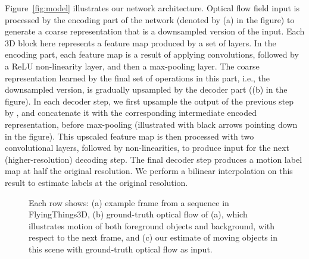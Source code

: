 \documentclass[10pt,twocolumn,letterpaper]{article}
\begin{document}
Figure~\ref{fig:model} illustrates our network architecture. Optical flow
field input is processed by the encoding part of the network (denoted by (a) in
the figure) to generate a coarse representation that is a 
downsampled version of the input. Each 3D block here represents a feature map
produced by a set of layers. In the encoding part, each feature map is a result
of applying convolutions, followed by a ReLU non-linearity layer, and then a
 max-pooling layer. The coarse representation learned by the final set
of operations in this part, i.e., the  downsampled version, is
gradually upsampled by the decoder part ((b) in the figure). In each decoder
step, we first upsample the output of the previous step by , and
concatenate it with the corresponding intermediate encoded representation,
before max-pooling (illustrated with black arrows pointing down in the figure).
This upscaled feature map is then processed with two convolutional layers,
followed by non-linearities, to produce input for the next (higher-resolution)
decoding step. The final decoder step produces a motion label map at half the
original resolution. We perform a bilinear interpolation on this result to
estimate labels at the original resolution.

\begin{figure}[t]
\begin{center}
 \vspace{0.1cm}
 \vspace{0.1cm}
\end{center}
\vspace{-0.3cm}\caption{Each row shows: (a) example frame from a sequence in
FlyingThings3D, (b) ground-truth optical flow of (a), which illustrates motion
of both foreground objects and background, with respect to the next frame, and
(c) our estimate of moving objects in this scene with ground-truth optical flow
as input.}
\vspace{-0.6cm}
\label{fig:qualff}
\end{figure}
\end{document}
